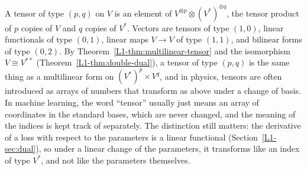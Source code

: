 \begin{remark}
    A tensor of type $(p, q)$ on $V$ is an element of $V^{\otimes p} \otimes (V^*)^{\otimes q}$, the tensor product of $p$ copies of $V$ and $q$ copies of $V^*$. Vectors are tensors of type $(1, 0)$, linear functionals of type $(0, 1)$, linear maps $V \to V$ of type $(1, 1)$, and bilinear forms of type $(0, 2)$. By Theorem~\ref{L1-thm:multilinear-tensor} and the isomorphism $V \cong V^{**}$ (Theorem~\ref{L1-thm:double-dual}), a tensor of type $(p, q)$ is the same thing as a multilinear form on $(V^*)^p \times V^q$, and in physics, tensors are often introduced as arrays of numbers that transform as above under a change of basis. In machine learning, the word ``tensor'' usually just means an array of coordinates in the standard bases, which are never changed, and the meaning of the indices is kept track of separately. The distinction still matters: the derivative of a loss with respect to the parameters is a linear functional (Section~\ref{L1-sec:dual}), so under a linear change of the parameters, it transforms like an index of type $V^*$, and not like the parameters themselves.
\end{remark}

